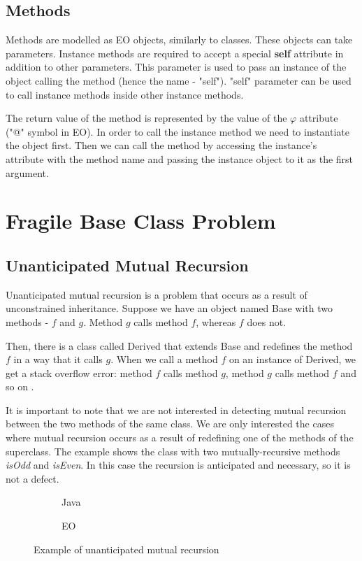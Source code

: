 \subsection{Methods}
Methods are modelled as EO objects, similarly to classes. These objects can take parameters.
Instance methods are required to accept a special \textbf{self} attribute in addition to other parameters. This parameter is used to pass an instance of the object calling the method (hence the name - "self").
"self" parameter can be used to call instance methods inside other instance methods.

The return value of the method is represented by the value of the $\varphi$ attribute ("@" symbol in EO). In order to call the instance method we need to instantiate the object first. Then we can call the method by accessing the instance's attribute with the method name and passing the instance object to it as the first argument.




\section{Fragile Base Class Problem}

\subsection{Unanticipated Mutual Recursion}
Unanticipated mutual recursion is a problem that occurs as a result of unconstrained inheritance. Suppose we have an object named Base with two methods - $f$ and $g$. Method $g$ calls method $f$, whereas $f$ does not.


Then, there is a class called Derived that extends Base and redefines the method $f$ in a way that it calls $g$. When we call a method $f$ on an instance of Derived, we get a stack overflow error: method $f$ calls method $g$, method $g$ calls method $f$ and so on .

It is important to note that we are not interested in detecting mutual recursion between the two methods of the same class. We are only interested the cases where mutual recursion occurs as a result of redefining one of the methods of the superclass. The example  shows the class with two mutually-recursive methods \textit{isOdd} and \textit{isEven}. In this case the recursion is anticipated and necessary, so it is not a defect.

\begin{figure}
    \centering
    \begin{subfigure}{0.4\textwidth}
        
        \caption{Java}
    \end{subfigure}
    \hfill
    \begin{subfigure}{0.4\textwidth}
        
        \caption{EO}
    \end{subfigure}
    \caption{Example of unanticipated mutual recursion}
    \label{fig:mutualrec_basic}
\end{figure}

